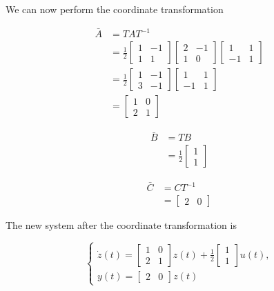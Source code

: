 \documentclass{article}
\begin{document}
\begin{enumerate}[label=\alph*)]
We can now perform the coordinate transformation

\begin{align*}
    \bar A &= T A T^{-1} \\
    &=
    \frac{1}{2}
    \begin{bmatrix}
        1 & -1 \\
        1 & 1
    \end{bmatrix}
    \begin{bmatrix}
        2 & -1 \\
        1 & 0
    \end{bmatrix}
    \begin{bmatrix}
        1 & 1 \\
        -1 & 1
    \end{bmatrix} \\
    &= \frac{1}{2}
    \begin{bmatrix}
        1 & -1 \\
        3 & -1 
    \end{bmatrix}
    \begin{bmatrix}
        1 & 1 \\
        -1 & 1
    \end{bmatrix} \\
    &= 
    \begin{bmatrix}
        1 & 0 \\
        2 & 1
    \end{bmatrix}
\end{align*}

\begin{align*}
    \bar B &= T B \\
    &= \frac{1}{2}
    \begin{bmatrix}
        1 \\
        1
    \end{bmatrix}
\end{align*}

\begin{align*}
    \bar C &= C T^{-1}  \\
    &=
    \begin{bmatrix}
        2 & 0
    \end{bmatrix}
\end{align*}

The new system after the coordinate transformation is

\[
\left\{
    \begin{array}{l}
        \dot z(t) = 
        \begin{bmatrix}
            1 & 0 \\
            2 & 1 
        \end{bmatrix}
        z(t) +  \frac{1}{2}
        \begin{bmatrix}
            1 \\
            1
        \end{bmatrix}
        u(t), \\
        y(t) = 
        \begin{bmatrix}
            2 & 0
        \end{bmatrix}
        z(t)
    \end{array}
\right.
\]


\end{enumerate}
\end{document}
